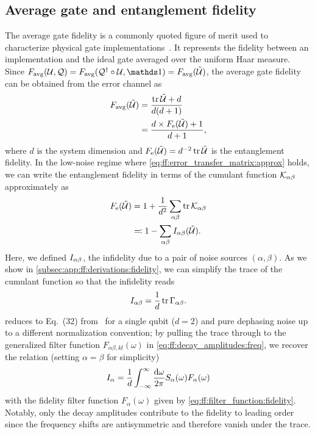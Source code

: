 \subsection{Average gate and entanglement fidelity}\label{subsec:ff:theory:derived_quantities:entanglement_fidelity}
The average gate fidelity is a commonly quoted figure of merit used to characterize physical gate implementations~\cite{Loss1998,Ladd2010,Chow2012,Veldhorst2014,Yoneda2018}.
It represents the fidelity between an implementation \liouvU and the ideal gate \liouvQ averaged over the uniform Haar measure.
Since $\avgfid(\liouvU, \liouvQ) = \avgfid(\liouvQ\adjoint\circ\liouvU, \eye) = \avgfid(\liouvUe)$, the average gate fidelity can be obtained from the error channel \liouvUe as~\cite{Horodecki1999,Nielsen2002}
\begin{align}
    F_{\mathrm{avg}}(\mathcal{\tilde{U}}) &= \frac{\tr\mathcal{\tilde{U}} + d}{d(d+1)} \label{eq:ff:fidelity:avg}\\
    &= \frac{d\times F_{\mathrm{e}}(\mathcal{\tilde{U}}) + 1}{d + 1}, \label{eq:ff:fidelity:avg-ent}
\end{align}
where $d$ is the system dimension and $F_{\mathrm{e}}(\mathcal{\tilde{U}}) = d^{-2}\tr\mathcal{\tilde{U}}$ is the entanglement fidelity.
In the low-noise regime where \cref{eq:ff:error_transfer_matrix:approx} holds, we can write the entanglement fidelity in terms of the cumulant function $\mathcal{K}_{\alpha\beta}$ approximately as
\begin{align}\label{eq:ff:fidelity:ent}
F_{\mathrm{e}}(\mathcal{\tilde{U}}) &= 1 + \frac{1}{d^2}\sum_{\alpha\beta}\tr\mathcal{K}_{\alpha\beta} \\
&\eqqcolon 1 - \sum_{\alpha\beta}I_{\alpha\beta}(\mathcal{\tilde{U}}).
\end{align}
Here, we defined $I_{\alpha\beta}$, the infidelity due to a pair of noise sources $(\alpha,\beta)$.
As we show in \cref{subsec:app:ff:derivations:fidelity}, we can simplify the trace of the cumulant function so that the infidelity reads
\begin{equation}\label{eq:ff:infidelity:ent}
I_{\alpha\beta} = \frac{1}{d}\tr\Gamma_{\alpha\beta}.
\end{equation}
 reduces to Eq.~(32) from~ for a single qubit ($d=2$) and pure dephasing noise up to a different normalization convention; by pulling the trace through to the generalized filter function $F_{\alpha\beta,kl}(\omega)$ in \cref{eq:ff:decay_amplitudes:freq}, we recover the relation (setting $\alpha=\beta$ for simplicity)
\begin{equation}\label{eq:ff:infidelity:ent:integral}
I_{\alpha} = \frac{1}{d}\int_{-\infty}^\infty\frac{\dd{\omega}}{2\pi} S_{\alpha}(\omega) F_{\alpha}(\omega)
\end{equation}
with the fidelity filter function $F_{\alpha}(\omega)$ given by \cref{eq:ff:filter_function:fidelity}.
Notably, only the decay amplitudes \decayamps contribute to the fidelity to leading order since the frequency shifts \freqshifts are antisymmetric and therefore vanish under the trace.

